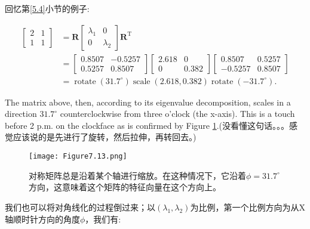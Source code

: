 \begin{example}
回忆第\ref{5.4}小节的例子:

\begin{equation}
	\begin{aligned}
		{\left[\begin{array}{ll}
				2 & 1 \\
				1 & 1
			\end{array}\right] } & =\mathbf{R}\left[\begin{array}{cc}
			\lambda_1 & 0 \\
			0 & \lambda_2
		\end{array}\right] \mathbf{R}^{\mathrm{T}} \\
		& =\left[\begin{array}{cc}
			0.8507 & -0.5257 \\
			0.5257 & 0.8507
		\end{array}\right]\left[\begin{array}{cc}
			2.618 & 0 \\
			0 & 0.382
		\end{array}\right]\left[\begin{array}{cc}
			0.8507 & 0.5257 \\
			-0.5257 & 0.8507
		\end{array}\right] \\
		& =\operatorname{rotate}\left(31.7^{\circ}\right) \operatorname{scale}(2.618,0.382) \operatorname{rotate}\left(-31.7^{\circ}\right) .
	\end{aligned}
\nonumber
\end{equation}

The matrix above, then, according to its eigenvalue decomposition, scales in a
direction $31.7^{\circ}$ counterclockwise from three o’clock (the x-axis). This is a touch
before 2 p.m. on the clockface as is confirmed by Figure \ref{fig:7.13}.(没看懂这句话。。。感觉应该说的是先进行了旋转，然后拉伸，再转回去。)

\begin{figure}[htbp]
	\centering
	\texttt{[image: Figure7.13.png]}
	\caption{对称矩阵总是沿着某个轴进行缩放。在这种情况下，它沿着$\phi = 31.7^{\circ}$方向，这意味着这个矩阵的特征向量在这个方向上。}
	\label{fig:7.13}
\end{figure}	

我们也可以将对角线化的过程倒过来；以$(\lambda_{1},\lambda_{2})$为比例，第一个比例方向为从X轴顺时针方向的角度$\phi$，我们有:


\end{example}
